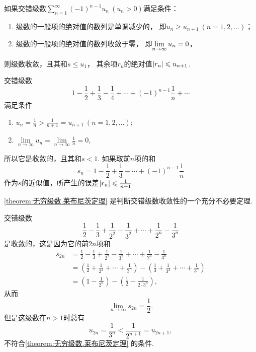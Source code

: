 \begin{theorem}[莱布尼茨定理]\label{theorem:无穷级数.莱布尼茨定理}
如果交错级数\(\sum\limits_{n=1}^\infty (-1)^{n-1} u_n\ (u_n>0)\)满足条件：
\begin{enumerate}
\item 级数的一般项的绝对值的数列是单调减少的，%
即\(u_n \geqslant u_{n+1}\ (n=1,2,\dotsc)\)；

\item 级数的一般项的绝对值的数列收敛于零，%
即\(\lim\limits_{n\to\infty} {u_n}=0\)，
\end{enumerate}
则级数收敛，且其和\(s \leqslant u_1\)，%
其余项\(r_n\)的绝对值\(\abs{r_n} \leqslant u_{n+1}\).
\end{theorem}

\begin{example}\label{example:无穷级数.交错级数1}
交错级数\[
1 - \frac{1}{2} + \frac{1}{3} - \frac{1}{4} + \dotsb + (-1)^{n-1} \frac{1}{n} + \dotsb
\]满足条件\begin{enumerate}
\item \(u_n = \frac{1}{n} > \frac{1}{n+1} = u_{n+1}\ (n=1,2,\dotsc)\);
\item \(\lim\limits_{n\to\infty} u_n = \lim\limits_{n\to\infty} \frac{1}{n} = 0\),
\end{enumerate}所以它是收敛的，且其和\(s < 1\).
如果取前\(n\)项的和\[
s_n = 1 - \frac{1}{2} + \frac{1}{3} - \dotsb + (-1)^{n-1} \frac{1}{n}
\]作为\(s\)的近似值，所产生的误差\(\abs{r_n} \leqslant \frac{1}{n+1}\).
\end{example}

\cref{theorem:无穷级数.莱布尼茨定理} 是判断交错级数收敛性的一个充分不必要定理.
\begin{example}
交错级数\[
\frac{1}{2} - \frac{1}{3}
+ \frac{1}{2^2} - \frac{1}{3^2}
+ \dotsm + \frac{1}{2^n} - \frac{1}{3^n}
\]是收敛的，这是因为它的前\(2n\)项和\begin{align*}
s_{2n} &= \frac{1}{2} - \frac{1}{3}
+ \frac{1}{2^2} - \frac{1}{3^2}
+ \dotsm + \frac{1}{2^n} - \frac{1}{3^n} \\
&= \left(\frac{1}{2} + \frac{1}{2^2} + \dotsm + \frac{1}{2^n}\right)
 - \left(\frac{1}{3} + \frac{1}{3^2} + \dotsm + \frac{1}{3^n}\right) \\
&= \left(1 - \frac{1}{2^n}\right)
 - \left(\frac{1}{2} - \frac{1}{2\cdot3^n}\right),
\end{align*}从而\[
\lim\limits_{n\to\infty} s_{2n} = \frac{1}{2}.
\]但是这级数在\(n>1\)时总有\[
u_{2n} = \frac{1}{3^n} < \frac{1}{2^{n+1}} = u_{2n+1},
\]不符合\cref{theorem:无穷级数.莱布尼茨定理} 的条件.
\end{example}

